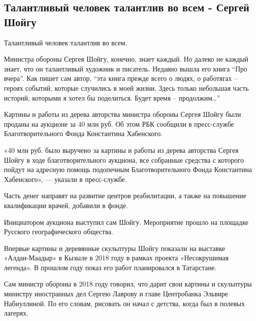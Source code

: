  
 
 
 
 
\subsection{Талантливый человек талантлив во всем - Сергей Шойгу}
\label{sec:16_05_2021.fb.shelkova_olga.1.shojgu_sergej_hudozhnik}

Талантливый человек талантлив во всем. 

Министра обороны Сергея Шойгу, конечно, знает каждый. Но далеко не каждый
знает, что он талантливый художник и писатель. Недавно вышла его книга \enquote{Про вчера}. Как пишет сам автор, 
\enquote{эта книга прежде всего о людях, о работягах –
героях событий, которые случились в моей жизни. Здесь только небольшая часть
историй, которыми я хотел бы поделиться. Будет время – продолжим…} 

Картины и работы из дерева авторства министра обороны Сергея Шойгу были проданы
на аукционе за 40 млн руб. Об этом РБК сообщили в пресс-службе
Благотворительного Фонда Константина Хабенского.

«40 млн руб. было выручено за картины и работы из дерева авторства Сергея Шойгу
в ходе благотворительного аукциона, все собранные средства с которого пойдут на
адресную помощь подопечным Благотворительного Фонда Константина Хабенского», —
указали в пресс-службе.

Часть денег направят на развитие центров реабилитации, а также на повышение квалификации врачей, добавили в фонде.

Инициатором аукциона выступил сам Шойгу. Мероприятие прошло на площадке Русского географического общества.

Впервые картины и деревянные скульптуры Шойгу показали на выставке
«Алдан-Маадыр» в Кызыле в 2018 году в рамках проекта «Несокрушимая легенда». В
прошлом году показ его работ планировался в Татарстане.

Сам министр обороны в 2018 году говорил, что дарит свои картины и скульптуры
министру иностранных дел Сергею Лаврову и главе Центробанка Эльвире
Набиуллиной. По его словам, рисовать он начал с детства, когда был в полевых
лагерях.

